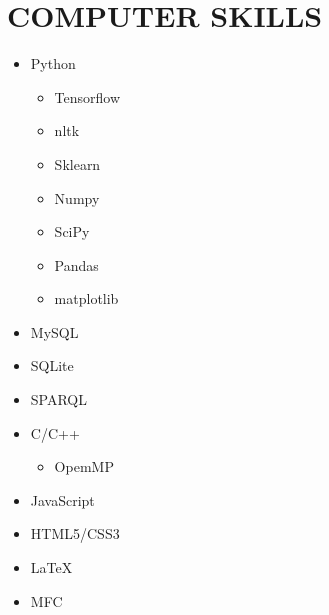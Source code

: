 \section{COMPUTER SKILLS}

\begin{cvcolumns}
	{
		\vspace{-2em}
		\begin{multicols}{2}
			\begin{itemize}
				\item Python
					\begin{itemize}
						\item Tensorflow
						\item nltk
						\item Sklearn
						\item Numpy
						\item SciPy
						\item Pandas
						\item matplotlib					\end{itemize}
				\item MySQL
				\item SQLite
				\item SPARQL
				\item C/C++ 
					\begin{itemize}
						\item OpemMP
					\end{itemize}
				\item JavaScript 
				\item HTML5/CSS3
				\item \LaTeX 
				\item MFC   
			\end{itemize}
		\end{multicols}
	}
	
	
\end{cvcolumns}

